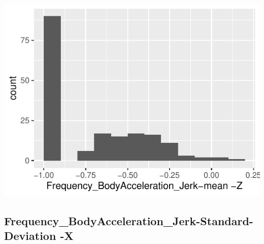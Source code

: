 \documentclass[
]{article}
\begin{document}
\begin{minipage}{0.25 \textwidth}

\includegraphics{codebook_tidydatasub_files/figure-latex/Var-54-Frequency-BodyAcceleration-Jerk-mean--Z-1.pdf}

\end{minipage}

\noindent\makebox[\linewidth]{\rule{\textwidth}{0.4pt}}

\hypertarget{frequency_bodyacceleration_jerk-standard-deviation--x}{%
\subsection{Frequency\_BodyAcceleration\_Jerk-Standard-Deviation
-X}\label{frequency_bodyacceleration_jerk-standard-deviation--x}}
\end{document}
